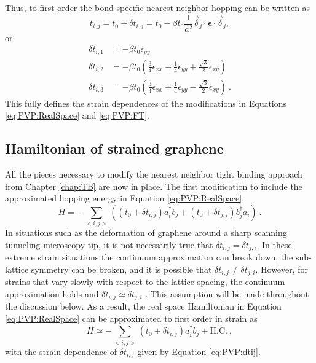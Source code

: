 Thus, to first order the bond-specific nearest neighbor hopping can be written as
\begin{equation*}
  t_{i,j}=t_0+\delta t_{i,j}=t_0-\beta t_0 \frac{1}{a^2} \vec{\delta}_{j} \cdot \bm{\epsilon} \cdot \vec{\delta}_{j},
\end{equation*}
or
\begin{align}
  \delta t_{i,1}&=-\beta t_0 \epsilon_{yy} \nonumber \\
  \delta t_{i,2}&=-\beta t_0 \left( \frac{3}{4}\epsilon_{xx} +\frac{1}{4} \epsilon_{yy} + \frac{\sqrt{3}}{2} \epsilon_{xy} \right) \nonumber \\
  \delta t_{i,3}&=-\beta t_0 \left( \frac{3}{4}\epsilon_{xx} +\frac{1}{4} \epsilon_{yy} - \frac{\sqrt{3}}{2} \epsilon_{xy} \right)  \label{eq:PVP:dtij}\ .
\end{align}
This fully defines the strain dependences of the modifications in Equations \ref{eq:PVP:RealSpace} and \ref{eq:PVP:FT}.

\subsection{Hamiltonian of strained graphene}
All the pieces necessary to modify the nearest neighbor tight binding approach from Chapter \ref{chap:TB} are now in place.
The first modification to include the approximated hopping energy in Equation \ref{eq:PVP:RealSpace},
\begin{equation*}
  H=-\sum_{<i,j>} \left( (t_0+\delta t_{i,j})  a_i^{\dagger} b_j + (t_0+\delta t_{j,i}) b_j^{\dagger} a_i \right) \ .
\end{equation*}
In situations such as the deformation of graphene around a sharp scanning tunneling microscopy tip, it is not necessarily true that $\delta t_{i,j} = \delta t_{j,i}$.
In these extreme strain situations the continuum approximation can break down, the sub-lattice symmetry can be broken, and it is possible that $\delta t_{i,j} \neq \delta t_{j,i}$.
However, for strains that vary slowly with respect to the lattice spacing, the continuum approximation holds and $\delta t_{i,j} \simeq \delta t_{j,i}$ \cite{Sloan2013}.
This assumption will be made throughout the discussion below.
As a result, the real space Hamiltonian in Equation \ref{eq:PVP:RealSpace} can be approximated to first order in strain as
\begin{equation*}
  H \simeq -\sum_{<i,j>} \left( t_0+\delta t_{i,j} \right)  a_i^{\dagger} b_j + \text{H.C.} \ ,
\end{equation*}
with the strain dependence of $\delta t_{i,j}$ given by Equation \ref{eq:PVP:dtij}.

